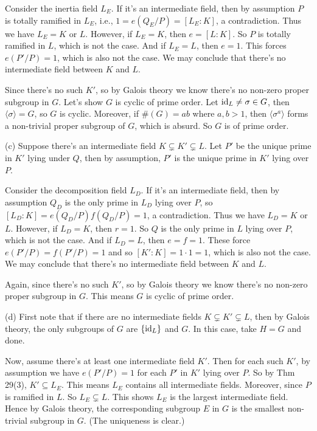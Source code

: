 \documentclass[../Marcus.tex]{subfiles}
\begin{document}
Consider the inertia field $L_E$. If it's an intermediate field, then by assumption $P$ is totally ramified in $L_E$, i.e., $1=e(Q_E/P)=[L_E:K]$, a contradiction. Thus we have $L_E=K$ or $L$. However, if $L_E=K$, then $e=[L:K]$. So $P$ is totally ramified in $L$, which is not the case. And if $L_E=L$, then $e=1$. This forces $e(P'/P)=1$, which is also not the case. We may conclude that there's no intermediate field between $K$ and $L$.

Since there's no such $K'$, so by Galois theory we know there's no non-zero proper subgroup in $G$. Let's show $G$ is cyclic of prime order. Let $\operatorname{id}_L\neq\sigma\in G$, then $\langle\sigma\rangle=G$, so $G$ is cyclic. Moreover, if $\#(G)=ab$ where $a,b>1$, then $\langle\sigma^a\rangle$ forms a non-trivial proper subgroup of $G$, which is absurd. So $G$ is of prime order.

(c) Suppose there's an intermediate field $K\varsubsetneq K'\varsubsetneq L$. Let $P'$ be the unique prime in $K'$ lying under $Q$, then by assumption, $P'$ is the unique prime in $K'$ lying over $P$.

Consider the decomposition field $L_D$. If it's an intermediate field, then by assumption $Q_D$ is the only prime in $L_D$ lying over $P$, so $[L_D:K]=e(Q_D/P)f(Q_D/P)=1$, a contradiction. Thus we have $L_D=K$ or $L$. However, if $L_D=K$, then $r=1$. So $Q$ is the only prime in $L$ lying over $P$, which is not the case. And if $L_D=L$, then $e=f=1$. These force $e(P'/P)=f(P'/P)=1$ and so $[K':K]=1\cdot 1=1$, which is also not the case. We may conclude that there's no intermediate field between $K$ and $L$.

Again, since there's no such $K'$, so by Galois theory we know there's no non-zero proper subgroup in $G$. This means $G$ is cyclic of prime order.

(d) First note that if there are no intermediate fields $K\varsubsetneq K'\varsubsetneq L$, then by Galois theory, the only subgroups of $G$ are $\{\operatorname{id}_L\}$ and $G$. In this case, take $H=G$ and done.

Now, assume there's at least one intermediate field $K'$. Then for each such $K'$, by assumption we have $e(P'/P)=1$ for each $P'$ in $K'$ lying over $P$. So by Thm 29(3), $K'\subseteq L_E$. This means $L_E$ contains all intermediate fields. Moreover, since $P$ is ramified in $L$. So $L_E\varsubsetneq L$. This shows $L_E$ is the largest intermediate field. Hence by Galois theory, the corresponding subgroup $E$ in $G$ is the smallest non-trivial subgroup in $G$. (The uniqueness is clear.)
\end{document}
